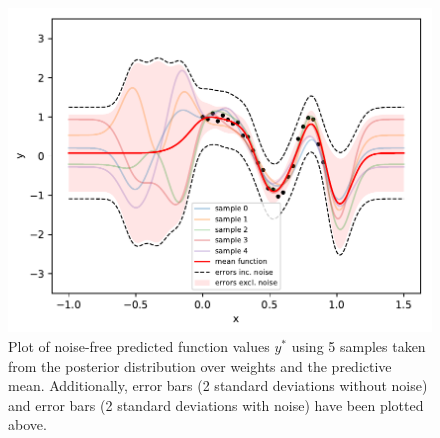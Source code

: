 \documentclass[12pt,twoside]{article}
\begin{document}
\begin{figure}[h]
\centering %
\includegraphics[width = 0.9\hsize] {./figures/exp_with_errs.pdf}
\caption{Plot of noise-free predicted function values $y^*$ using 5 samples taken from the posterior distribution over weights and the predictive mean. Additionally, error bars (2 standard deviations without noise) and error bars (2 standard deviations with noise) have been plotted above.}%
\label{fig:exp_with_errs}
\end{figure}
\end{document}
